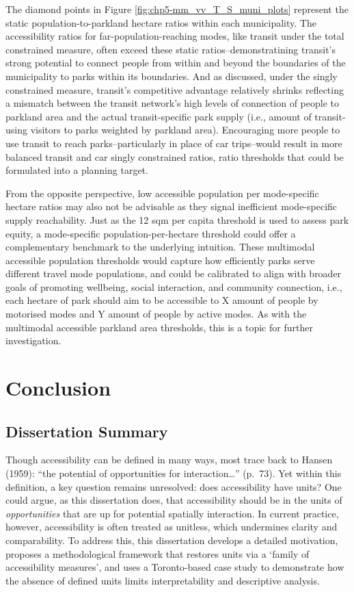 \documentclass[
11pt, %
oneside, %
english, %
singlespacing, %
]{macthesis} %
\begin{document}
The diamond points in Figure \ref{fig:chp5-mm_vv_T_S_muni_plots} represent the static population-to-parkland hectare ratios within each municipality. The accessibility ratios for far-population-reaching modes, like transit under the total constrained measure, often exceed these static ratios--demonstratining transit's strong potential to connect people from within and beyond the boundaries of the municipality to parks within its boundaries. And as discussed, under the singly constrained measure, transit's competitive advantage relatively shrinks reflecting a mismatch between the transit network's high levels of connection of people to parkland area and the actual transit-specific park supply (i.e., amount of transit-using visitors to parks weighted by parkland area). Encouraging more people to use transit to reach parks--particularly in place of car trips--would result in more balanced transit and car singly constrained ratios, ratio thresholds that could be formulated into a planning target.

From the opposite perspective, low accessible population per mode-specific hectare ratios may also not be advisable as they signal inefficient mode-specific supply reachability. Just as the 12 sqm per capita threshold is used to assess park equity, a mode-specific population-per-hectare threshold could offer a complementary benchmark to the underlying intuition. These multimodal accessible population thresholds would capture how efficiently parks serve different travel mode populations, and could be calibrated to align with broader goals of promoting wellbeing, social interaction, and community connection, i.e., each hectare of park should aim to be accessible to X amount of people by motorised modes and Y amount of people by active modes. As with the multimodal accessible parkland area thresholds, this is a topic for further investigation.

\chapter*{Conclusion}\label{conclusion-1}

\section{Dissertation Summary}\label{dissertation-summary}

Though accessibility can be defined in many ways, most trace back to Hansen (1959): ``the potential of opportunities for interaction\ldots{}'' (p.~73). Yet within this definition, a key question remains unresolved: does accessibility have units? One could argue, as this dissertation does, that accessibility should be in the units of \emph{opportunities} that are up for potential spatially interaction. In current practice, however, accessibility is often treated as unitless, which undermines clarity and comparability. To address this, this dissertation develops a detailed motivation, proposes a methodological framework that restores units via a `family of accessibility measures', and uses a Toronto-based case study to demonstrate how the absence of defined units limits interpretability and descriptive analysis.
\end{document}
